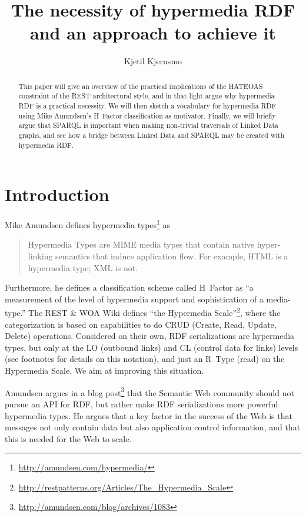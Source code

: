 \documentclass{llncs}
\title{The necessity of hypermedia RDF and an approach to achieve it}
\author{Kjetil Kjernsmo\inst{1}}
\institute{Department of Informatics,
Postboks 1080 Blindern,
0316 Oslo, Norway
\email{kjekje@ifi.uio.no}}
\begin{document}
\maketitle



\begin{abstract}
This paper will give an overview of the practical implications of the
HATEOAS constraint of the REST architectural style, and in that light argue why
hypermedia RDF is a practical necessity. We will then sketch a
vocabulary for hypermedia RDF using Mike Amundsen's H~Factor
classification as motivator. Finally, we will briefly argue that
SPARQL is important when making non-trivial traversals of Linked Data
graphs, and see how a bridge between Linked Data and SPARQL may be
created with hypermedia RDF.
\end{abstract}

\section{Introduction}

Mike Amundsen defines hypermedia types\footnote{\url{http://amundsen.com/hypermedia/}} as 
\begin{quote}
Hypermedia Types are MIME media types that contain native
hyper-linking semantics that induce application flow. For example,
HTML is a hypermedia type; XML is not.
\end{quote}
Furthermore, he defines a classification scheme called H~Factor as ``a
measurement of the level of hypermedia support and sophistication of a
media-type.'' The REST \& WOA Wiki defines ``the Hypermedia
Scale''\footnote{\url{http://restpatterns.org/Articles/The\_Hypermedia\_Scale}},
where the categorization is based on capabilities to do CRUD (Create,
Read, Update, Delete) operations.  Considered on their own, RDF
serializations are hypermedia types, but only at the \textsf{LO}
(outbound links) and \textsf{CL} (control data for links) levels (see
footnotes for details on this notation), and just an R~Type (read) on
the Hypermedia Scale. We aim at improving this situation.

Amundsen argues in a blog
post\footnote{\url{http://amundsen.com/blog/archives/1083}} that the
Semantic Web community should not pursue an API for RDF, but rather
make RDF serializations more powerful hypermedia types. He argues that
a key factor in the success of the Web is that messages not only
contain data but also application control information, and that this is
needed for the Web to scale.
\end{document}
